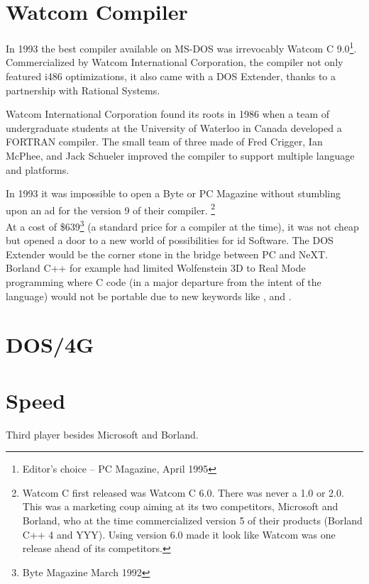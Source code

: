 \section{Watcom Compiler}
In 1993 the best compiler available on MS-DOS was irrevocably Watcom C 9.0\footnote{Editor's choice -- PC Magazine, April 1995}. Commercialized by Watcom International Corporation, the compiler not only featured i486 optimizations, it also came with a DOS Extender,  thanks to a partnership with Rational Systems.\\
\par
Watcom International Corporation found its roots in 1986 when a team of undergraduate students at the University of Waterloo in Canada developed a FORTRAN compiler. The small team of three made of Fred Crigger, Ian McPhee, and Jack Schueler improved the compiler to support multiple language and platforms.\\
\par
In 1993 it was impossible to open a Byte or PC Magazine without stumbling upon an ad for the version 9 of their compiler. \footnote{Watcom C first released was Watcom C 6.0. There was never a 1.0 or 2.0. This was a marketing coup aiming at its two competitors, Microsoft and Borland, who at the time commercialized version 5 of their products (Borland C++ 4 and YYY). Using version 6.0 made it look like Watcom was one release ahead of its competitors.}
\\
At a cost of \$639\footnote{Byte Magazine March 1992} (a standard price for a compiler at the time), it was not cheap but opened a door to a new world of possibilities for id Software. The DOS Extender would be the corner stone in the bridge between PC and NeXT. Borland C++ for example had limited Wolfenstein 3D to Real Mode programming where C code (in a major departure from the intent of the language) would not be portable due to new keywords like , and .\\
\par

\section{DOS/4G}

\section{Speed}
Third player besides Microsoft and Borland.

